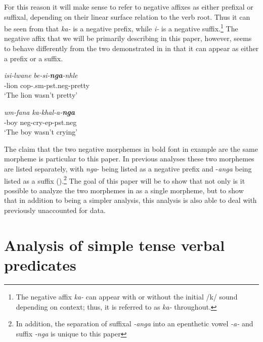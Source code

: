 \documentclass[output=paper]{langsci/langscibook}
\begin{document}
For this reason it will make sense to refer to negative affixes as either prefixal or suffixal, depending on their linear surface relation to the verb root. Thus it can be seen from  that \textit{ka-} is a negative prefix, while \textit{i-} is a negative suffix.\footnote{The negative affix \textit{ka-} can appear with or without the initial /k/ sound depending on context; thus, it is referred to as \textit{ka-} throughout.} The negative affix that we will be primarily describing in this paper, however, seems to behave differently from the two demonstrated in  in that it can appear as either a prefix or a suffix.
 
\begin{exe}
\ex\label{ex:burkholder:2}
\begin{xlist}
\ex\label{ex:burkholder:2a} 
\gll \textit{isi-lwane}  \textit{be-si-\textbf{nga}-nhle}\\
       -lion {\sc cop}-.{\sc sm}-{\sc pst.neg}-pretty\\
    \glt `The lion wasn't pretty' 

\ex\label{ex:burkholder:2b}  
\gll \textit{um-fana} \textit{ka-khal-a-\textbf{nga}}\\
         -boy {\sc neg}-cry-{\sc ep}-{\sc pst.neg}\\
    \glt `The boy wasn't crying'
\end{xlist}
\end{exe}

The claim that the two negative morphemes in bold font in example  are the same morpheme is particular to this paper. In previous analyses these two morphemes are listed separately, with \textit{nga}- being listed as a negative prefix and -\textit{anga} being listed as a suffix (\citealt{Sibanda2004,Khumalo1981,Khumalo1982}).\footnote{In addition, the separation of suffixal \textit{-anga} into an epenthetic vowel \textit{-a-} and suffix \textit{-nga} is unique to this paper} The goal of this paper will be to show that not only is it possible to analyze the two morphemes in  as a single morpheme, but to show that in addition to being a simpler analysis, this analysis is also able to deal with previously unaccounted for data.

\section{Analysis of simple tense verbal predicates}\label{sec:burkholder:2}
\end{document}
